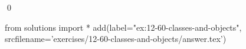
\begin{ex}
  \label{ex:12-60-classes-and-objects}
  
  \qed
\end{ex}
\begin{python0}
from solutions import *
add(label="ex:12-60-classes-and-objects",
    srcfilename='exercises/12-60-classes-and-objects/answer.tex')
\end{python0}

